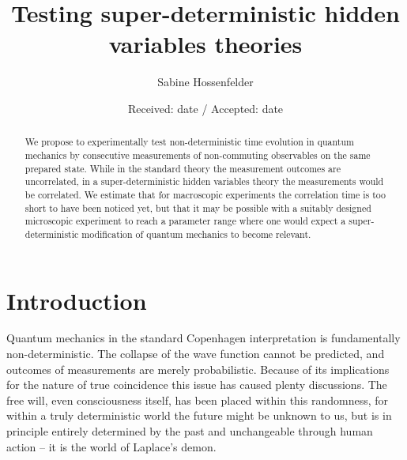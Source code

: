 \documentclass{svjour2}                    %
\begin{document}
\title{Testing super-deterministic hidden variables theories}


\author{Sabine Hossenfelder }



\date{Received: date / Accepted: date}


\maketitle

\begin{abstract}
We propose to experimentally test non-deterministic time evolution in quantum
mechanics by consecutive measurements of non-commuting observables
on the same prepared state. While in the standard theory the measurement
outcomes are uncorrelated, in a
super-deterministic hidden variables theory the measurements would
be correlated. We estimate that for macroscopic experiments the
correlation time is too short to have been noticed yet, but that
it may be possible with a suitably designed microscopic experiment 
to reach a parameter range where one would expect a super-deterministic
modification of quantum mechanics to become relevant. 

\end{abstract}

\section{Introduction}

Quantum mechanics in the standard Copenhagen 
interpretation is fundamentally non-deterministic. The collapse of the wave function 
cannot be predicted, and outcomes 
of measurements are merely probabilistic. Because of its implications for 
the nature of true coincidence this issue has caused plenty discussions. The 
free will, even consciousness itself, has been placed within this 
randomness, for within a truly deterministic world the future might be unknown 
to us, but is in principle entirely determined by the past and unchangeable through 
human action -- it is the world of Laplace's demon. 
\end{document}
